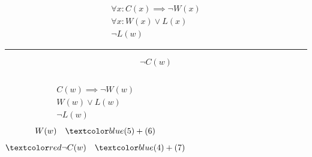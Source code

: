 \begin{frame}{}
  \setcounter{equation}{0}
  \begin{gather}
    \forall x: C(x) \implies \lnot W(x) \\[5pt]
    \forall x: W(x) \lor L(x) \\[5pt]
    \lnot L(w)
  \end{gather}
  
  \hrule
  \[
    \lnot C(w)
  \]

  \begin{columns}
      \pause
      \begin{gather}
	C(w) \implies \lnot W(w) \\[5pt]
	W(w) \lor L(w) \\[5pt]
	\lnot L(w)
      \end{gather}
      \pause
      \begin{gather}
	W(w) \quad \blue{(5) + (6)} \\[5pt]
	\red{\lnot C(w)} \quad \blue{(4) + (7)} 
      \end{gather}
  \end{columns}
\end{frame}

